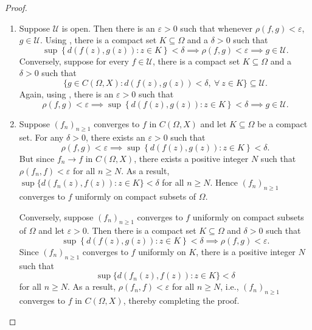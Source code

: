 \documentclass[11pt]{article}
\theoremstyle{thmstyle}
\theoremstyle{defstyle}
\newcommand{\scrU}{\mathscr{U}}
\newcommand{\calU}{\mathcal{U}}
\renewcommand{\ge}{\geqslant}
\begin{document}
\begin{proof}
\begin{enumerate}[label=(\arabic*)]
    \item Suppose $\calU$ is open. Then there is an $\varepsilon > 0$ such that whenever $\rho(f, g) < \varepsilon$, $g\in\calU$. Using , there is a compact set $K\subseteq\Omega$ and a $\delta > 0$ such that 
    \begin{equation*}
        \sup\left\{d(f(z), g(z))\colon z\in K\right\} < \delta \implies \rho(f, g) < \varepsilon\implies g\in\calU.
    \end{equation*}
    Conversely, suppose for every $f\in\calU$, there is a compact set $K\subseteq\Omega$ and a $\delta > 0$ such that 
    \begin{equation*}
        \{g\in C(\Omega, X)\colon d(f(z), g(z)) < \delta,~\forall~z\in K\}\subseteq\calU.
    \end{equation*}
    Again, using , there is an $\varepsilon > 0$ such that 
    \begin{equation*}
        \rho(f, g) < \varepsilon \implies\sup\left\{d(f(z), g(z))\colon z\in K\right\} < \delta\implies g\in\scrU.
    \end{equation*}

    \item Suppose $(f_n)_{n\ge 1}$ converges to $f$ in $C(\Omega, X)$ and let $K\subseteq\Omega$ be a compact set. For any $\delta > 0$, there exists an $\varepsilon > 0$ such that 
    \begin{equation*}
        \rho(f, g) < \varepsilon\implies\sup\left\{d(f(z), g(z))\colon z\in K\right\} < \delta.
    \end{equation*}
    But since $f_n\to f$ in $C(\Omega, X)$, there exists a positive integer $N$ such that $\rho(f_n, f) < \varepsilon$ for all $n\ge N$. As a result, $\sup\{d(f_n(z), f(z))\colon z\in K\} < \delta$ for all $n\ge N$. Hence $(f_n)_{n\ge 1}$ converges to $f$ uniformly on compact subsets of $\Omega$. 

    Conversely, suppose $(f_n)_{n\ge 1}$ converges to $f$ uniformly on compact subsets of $\Omega$ and let $\varepsilon > 0$. Then there is a compact set $K\subseteq\Omega$ and $\delta > 0$ such that 
    \begin{equation*}
        \sup\left\{d(f(z), g(z))\colon z\in K\right\} < \delta\implies\rho(f, g) < \varepsilon.
    \end{equation*}
    Since $(f_n)_{n\ge 1}$ converges to $f$ uniformly on $K$, there is a positive integer $N$ such that 
    \begin{equation*}
    \sup\{d(f_n(z), f(z))\colon z\in K\} < \delta
    \end{equation*}
    for all $n\ge N$. As a result, $\rho(f_n, f) < \varepsilon$ for all $n\ge N$, i.e., $(f_n)_{n\ge 1}$ converges to $f$ in $C(\Omega, X)$, thereby completing the proof. \qedhere
\end{enumerate}
\end{proof}
\end{document}
